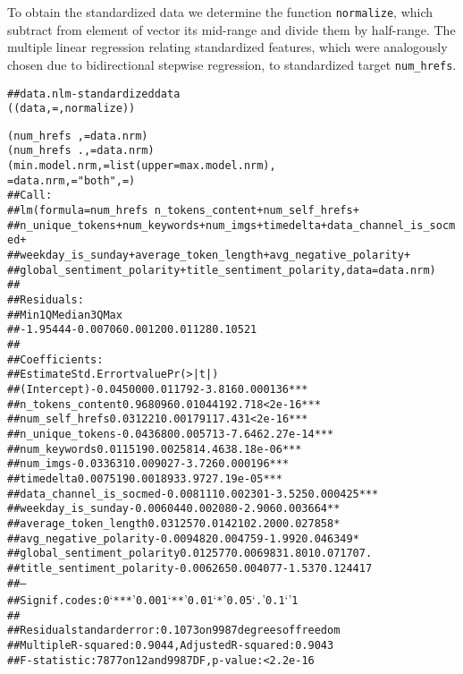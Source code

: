 To obtain the standardized data we determine the function \texttt{normalize}, which subtract from element of vector its mid-range and divide them by half-range. The multiple linear regression relating standardized features, which were analogously chosen due to bidirectional stepwise regression, to standardized target \texttt{num\_hrefs}. 
\begin{knitrout}
\color{fgcolor}\begin{kframe}
\begin{alltt}
## data.nlm - standardized data
 \hlkwb{<-} ((data,  = , normalize))

 \hlkwb{<-} (num_hrefs~,  =data.nrm)
 \hlkwb{<-} (num_hrefs~., =data.nrm)
 \hlkwb{<-} (min.model.nrm,   = list(upper=max.model.nrm), 
 = data.nrm,  = "both",  = )
## Call:
## lm(formula = num_hrefs ~ n_tokens_content + num_self_hrefs + 
##     n_unique_tokens + num_keywords + num_imgs + timedelta + data_channel_is_socmed + 
##     weekday_is_sunday + average_token_length + avg_negative_polarity + 
##     global_sentiment_polarity + title_sentiment_polarity, data = data.nrm)
## 
## Residuals:
##      Min       1Q   Median       3Q      Max 
## -1.95444 -0.00706  0.00120  0.01128  0.10521 
## 
## Coefficients:
##                            Estimate Std. Error t value Pr(>|t|)    
## (Intercept)               -0.045000   0.011792  -3.816 0.000136 ***
## n_tokens_content           0.968096   0.010441  92.718  < 2e-16 ***
## num_self_hrefs             0.031221   0.001791  17.431  < 2e-16 ***
## n_unique_tokens           -0.043680   0.005713  -7.646 2.27e-14 ***
## num_keywords               0.011519   0.002581   4.463 8.18e-06 ***
## num_imgs                  -0.033631   0.009027  -3.726 0.000196 ***
## timedelta                  0.007519   0.001893   3.972 7.19e-05 ***
## data_channel_is_socmed    -0.008111   0.002301  -3.525 0.000425 ***
## weekday_is_sunday         -0.006044   0.002080  -2.906 0.003664 ** 
## average_token_length       0.031257   0.014210   2.200 0.027858 *  
## avg_negative_polarity     -0.009482   0.004759  -1.992 0.046349 *  
## global_sentiment_polarity  0.012577   0.006983   1.801 0.071707 .  
## title_sentiment_polarity  -0.006265   0.004077  -1.537 0.124417    
## ---
## Signif. codes:  0 ‘***’ 0.001 ‘**’ 0.01 ‘*’ 0.05 ‘.’ 0.1 ‘ ’ 1
## 
## Residual standard error: 0.1073 on 9987 degrees of freedom
## Multiple R-squared:  0.9044,	Adjusted R-squared:  0.9043 
## F-statistic:  7877 on 12 and 9987 DF,  p-value: < 2.2e-16
\end{alltt}
\end{kframe}
\end{knitrout}

